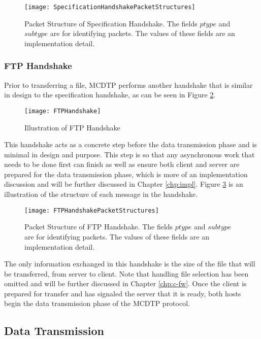 \begin{figure}[ht]
\centering
\texttt{[image: SpecificationHandshakePacketStructures]}
\caption{Packet Structure of Specification Handshake. The fields $ptype$ and $subtype$ are for identifying packets. The values of these fields are an implementation detail.}
\label{fig:specs-struct}
\end{figure}

\subsubsection{FTP Handshake}\label{subsec:ftp-hs}

Prior to transferring a file, MCDTP performs another handshake that is similar in design to the specification handshake, as can be seen in Figure \ref{fig:ftp-hs}.

\begin{figure}[ht]
\centering
\texttt{[image: FTPHandshake]}
\caption{Illustration of FTP Handshake}
\label{fig:ftp-hs}
\end{figure}

This handshake acts as a concrete step before the data transmission phase and is minimal in design and purpose. This step is so that any asynchronous work that needs to be done first can finish as well as ensure both client and server are prepared for the data transmission phase, which is more of an implementation discussion and will be further discussed in Chapter \ref{chp:impl}. Figure \ref{fig:ftp-struct} is an illustration of the structure of each message in the handshake.

\begin{figure}[ht]
\centering
\texttt{[image: FTPHandshakePacketStructures]}
\caption{Packet Structure of FTP Handshake. The fields $ptype$ and $subtype$ are for identifying packets. The values of these fields are an implementation detail.}
\label{fig:ftp-struct}
\end{figure}

 The only information exchanged in this handshake is the size of the file that will be transferred, from server to client. Note that handling file selection has been omitted and will be further discussed in Chapter \ref{chp:c-fw}. Once the client is prepared for transfer and has signaled the server that it is ready, both hosts begin the data transmission phase of the MCDTP protocol.

\subsection{Data Transmission}

